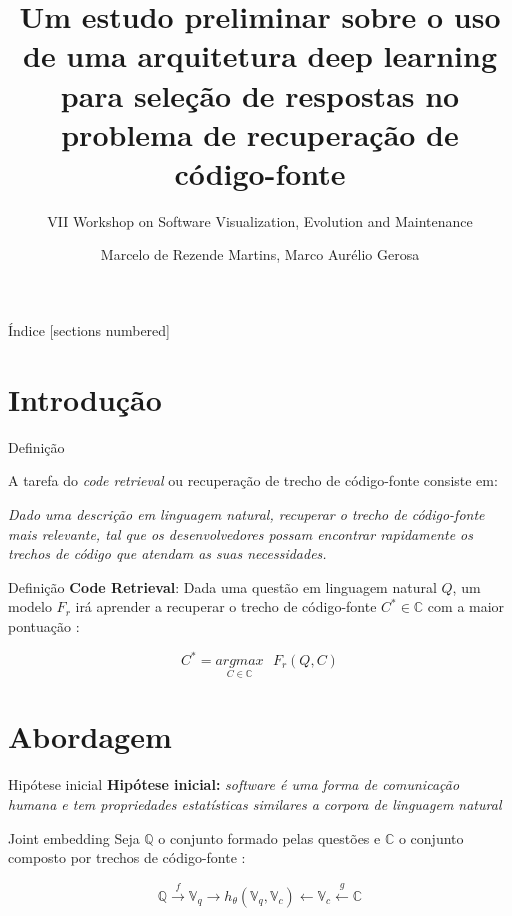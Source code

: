 \documentclass[10pt]{beamer}
\title{Um estudo preliminar sobre o uso de uma arquitetura deep learning para seleção de respostas no problema de recuperação de código-fonte}
\subtitle{VII Workshop on Software Visualization, Evolution and Maintenance}
\date{}
\author{Marcelo de Rezende Martins\inst{1}, Marco Aurélio Gerosa\inst{2}}
\institute{\inst{1}Instituto de Pesquisas Tecnológicas
  (IPT) \and \inst{2}Northern Arizona University (NAU)}
\begin{document}
\maketitle

\begin{frame}{Índice}
  [sections numbered]
  \tableofcontents%
\end{frame}

\section[Introdução]{Introdução}

\begin{frame}[fragile]{Definição}

A tarefa do \textit{code retrieval} ou recuperação de trecho de código-fonte consiste em:
 
\emph{Dado uma descrição em linguagem natural, recuperar o trecho de código-fonte mais relevante, tal que os desenvolvedores possam encontrar rapidamente os trechos de código que atendam as suas necessidades. \cite{Chen-bi-variational-autoencoder:2018}}
 
\end{frame}
\begin{frame}[fragile]{Definição}
  \textbf{Code Retrieval}: Dada uma questão em linguagem natural $Q$, um modelo $F_{r}$ irá aprender a recuperar o trecho de código-fonte $C^{*} \in \mathbb{C}$ com a maior pontuação \cite{yao-2018}:

\begin{equation}\label{eq:code-retrieval}
C^{*} = \underset{C \in \mathbb{C}}{argmax}\text{ } F_{r}(Q , C)
\end{equation}
  
\end{frame}

\section{Abordagem}

\begin{frame}{Hipótese inicial}
	\textbf{Hipótese inicial:} \emph{software é uma forma de comunicação humana e tem propriedades estatísticas similares a corpora de linguagem natural \cite{Allamanis:2018:SML}}
\end{frame}

\begin{frame}{Joint embedding}
	Seja $\mathbb{Q}$ o conjunto formado pelas questões e $\mathbb{C}$ o conjunto composto por trechos de código-fonte \cite{Gu-deep-code-search:2018}:
	
    \begin{equation}
        \mathbb{Q} \xrightarrow{f} \mathbb{V}_{q} \rightarrow h_{\theta}(\mathbb{V}_{q}, \mathbb{V}_{c}) \leftarrow \mathbb{V}_{c} \xleftarrow{g} \mathbb{C}
    \end{equation}
\end{frame}
\end{document}
